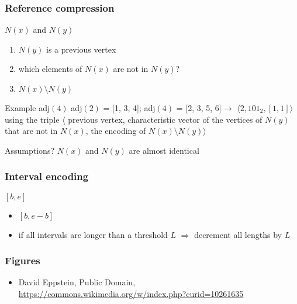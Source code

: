 \begin{frame}[fragile]
\frametitle{Reference compression}
\begin{block}{\(N(x)\) and \(N(y)\)}
\begin{enumerate}
\item
      \(N(y)\) is a previous vertex
\item

      which elements of \(N(x)\) are not in \(N(y)\)?
\item
      \(N(x) \setminus N(y)\)
\end{enumerate}
\end{block}
\pause
\begin{block}{Example adj\((4)\)}
adj\((2)\) = [1, 3, 4];
adj\((4)\) = [2, 3, 5, 6]\(\rightarrow\) \(\langle 2, 101_{2}, [1, 1]\rangle\)\\
using the triple \(\langle\) previous vertex, characteristic vector of the
vertices of \(N(y)\) that are not in \(N(x)\), the encoding of \(N(x) \setminus N(y)\rangle\)
\end{block}
\pause
\begin{block}{Assumptions?}
\pause
\(N(x)\) and \(N(y)\) are almost identical
\end{block}
\end{frame}


\begin{frame}[fragile]
\frametitle{Interval encoding}
\pause
\begin{block}{\([b,e]\)}
\begin{itemize}
      \item
      \([b, e - b]\)
      \item if all intervals are longer than a threshold \(L\) \(\Rightarrow\)
      decrement all lengths by \(L\)
\end{itemize}
\end{block}
\end{frame}

\begin{frame}[fragile]
\frametitle{Figures}

        \begin{itemize}
          \item
David Eppstein, Public Domain, \url{https://commons.wikimedia.org/w/index.php?curid=10261635}
        \end{itemize}
\end{frame}


